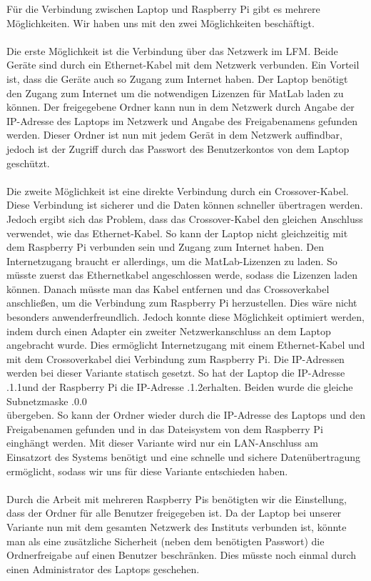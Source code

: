 \documentclass[a4paper]{report}
\begin{document}
Für die Verbindung zwischen Laptop und Raspberry Pi gibt es mehrere Möglichkeiten. Wir haben uns mit den zwei Möglichkeiten beschäftigt. \\ \\
 Die erste Möglichkeit ist die Verbindung über das Netzwerk im LFM. Beide Geräte sind durch ein Ethernet-Kabel mit dem Netzwerk verbunden. Ein Vorteil ist, dass die Geräte auch so Zugang zum Internet haben. Der Laptop benötigt den Zugang zum Internet um die notwendigen Lizenzen für MatLab laden zu können. Der freigegebene Ordner kann nun in dem Netzwerk durch Angabe der IP-Adresse des Laptops im Netzwerk und Angabe des Freigabenamens gefunden werden. Dieser Ordner ist nun mit jedem Gerät in dem Netzwerk auffindbar, jedoch ist der Zugriff durch das Passwort des Benutzerkontos von dem Laptop geschützt. \\ \\
Die zweite Möglichkeit ist eine direkte Verbindung durch ein Crossover-Kabel. Diese Verbindung ist sicherer und die Daten können schneller übertragen werden. Jedoch ergibt sich das Problem, dass das Crossover-Kabel den gleichen Anschluss verwendet, wie das Ethernet-Kabel. So kann der Laptop nicht gleichzeitig mit dem Raspberry Pi verbunden sein und Zugang zum Internet haben. Den Internetzugang braucht er allerdings, um die MatLab-Lizenzen zu laden. So müsste zuerst das Ethernetkabel angeschlossen werde, sodass die Lizenzen laden können. Danach müsste man das Kabel entfernen und das Crossoverkabel anschließen, um die Verbindung zum Raspberry Pi herzustellen. Dies wäre nicht besonders anwenderfreundlich. Jedoch konnte diese Möglichkeit optimiert werden, indem durch einen Adapter ein zweiter Netzwerkanschluss an dem Laptop angebracht wurde. Dies ermöglicht Internetzugang mit einem Ethernet-Kabel und mit dem Crossoverkabel diei Verbindung zum Raspberry Pi. Die IP-Adressen werden bei dieser Variante statisch gesetzt. So hat der Laptop die IP-Adresse .1.1\grqq und der Raspberry Pi die IP-Adresse  .1.2\grqq erhalten. Beiden wurde die gleiche Subnetzmaske  .0.0\grqq \\ übergeben. So kann der Ordner wieder durch die IP-Adresse des Laptops und den Freigabenamen gefunden und in das Dateisystem von dem Raspberry Pi einghängt werden. Mit dieser Variante wird nur ein LAN-Anschluss am Einsatzort des Systems benötigt und eine schnelle und sichere Datenübertragung ermöglicht, sodass wir uns für diese Variante entschieden haben. \\ \\
Durch die Arbeit mit mehreren Raspberry Pis benötigten wir die Einstellung, dass der Ordner für alle Benutzer freigegeben ist. Da der Laptop bei unserer Variante nun mit dem gesamten Netzwerk des Instituts verbunden ist, könnte man als eine zusätzliche Sicherheit (neben dem benötigten Passwort) die Ordnerfreigabe auf einen Benutzer beschränken. Dies müsste noch einmal durch einen Administrator des Laptops geschehen. 
\end{document}
